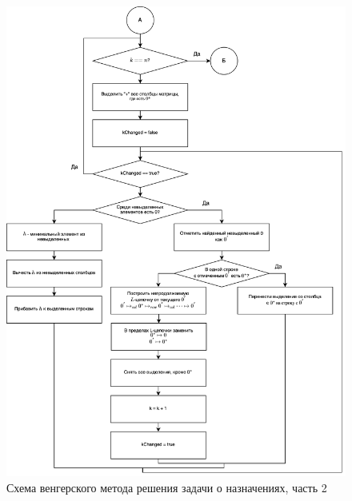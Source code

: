 \documentclass{bmstu}
\begin{document}
\begin{figure}[h!]
	\begin{center}
		\includegraphics[scale=0.13]{inc/img/2.png}
	\end{center}
	\caption{Схема венгерского метода решения задачи о назначениях, часть 2}
	\label{img:2}
\end{figure}
\end{document}
